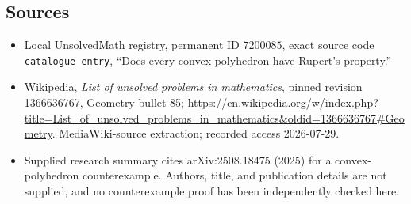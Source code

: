 \documentclass[11pt]{article}
\begin{document}
\subsection{Sources}
\begin{itemize}
\item Local UnsolvedMath registry, permanent ID \(7200085\), exact source code \texttt{catalogue entry}, ``Does every convex polyhedron have Rupert's property.''
\item Wikipedia, \emph{List of unsolved problems in mathematics}, pinned revision 1366636767, Geometry bullet 85; \url{https://en.wikipedia.org/w/index.php?title=List_of_unsolved_problems_in_mathematics&oldid=1366636767#Geometry}. MediaWiki-source extraction; recorded access 2026-07-29.
\item Supplied research summary cites arXiv:2508.18475 (2025) for a convex-polyhedron counterexample. Authors, title, and publication details are not supplied, and no counterexample proof has been independently checked here.
\end{itemize}
\end{document}
